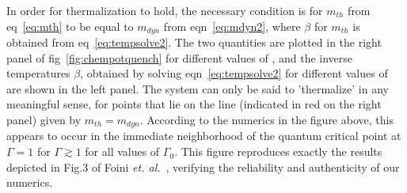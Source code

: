 \documentclass[a4paper,10pt]{article}
\begin{document}
In order for thermalization to hold, the necessary condition is for $m_{th}$ from eq~\ref{eq:mth} to be equal to $m_{dyn}$ from eqn~\ref{eq:mdyn2}, where $\beta$ for $m_{th}$ is obtained from eq~\ref{eq:tempsolve2}. The two quantities are plotted in the right panel of fig~\ref{fig:chempotquench} for different values of , and the inverse temperatures $\beta$, obtained by solving eqn~\ref{eq:tempsolve2} for different values of  are shown in the left panel. The system can only be said to 'thermalize' in any meaningful sense, for points that lie on the line (indicated in red on the right panel) given by $m_{th}=m_{dyn}$. According to the numerics in the figure above, this appears to occur in the immediate neighborhood of the quantum critical point at $\Gamma=1$ for $\Gamma\gtrsim1$  for all values of $\Gamma_0$. This figure reproduces exactly the results depicted in Fig.3 of Foini \textit{et. al.}~\cite{leticia}, verifying the reliability and authenticity of our numerics.
\end{document}
